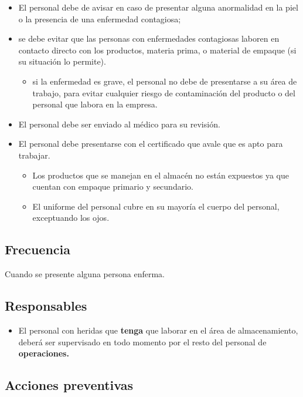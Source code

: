 \begin{itemize}
	\item El personal debe de avisar en caso de presentar alguna anormalidad en la piel o la presencia de una enfermedad contagiosa;
	\item se debe evitar que las personas con enfermedades contagiosas laboren en contacto directo con los productos, materia prima, o material de empaque (si su situación lo permite).
	\begin{itemize}
		\item si la enfermedad es grave, el personal no debe de presentarse a su área de trabajo, para evitar cualquier riesgo de contaminación del producto o del personal que labora en la empresa.
	\end{itemize}
	\item El personal debe ser enviado al médico para su revisión.
	\item El personal debe presentarse con el certificado que avale que es apto para trabajar.
	\begin{itemize}
		\item Los productos que se manejan en el almacén no están expuestos ya que cuentan con empaque primario y secundario.
		\item El uniforme del personal cubre en su mayoría el cuerpo del personal, exceptuando los ojos.
	\end{itemize}
\end{itemize}

\subsection{Frecuencia}

Cuando se presente alguna persona enferma.

\subsection{Responsables}

\begin{itemize}
	\item El personal con heridas que \textbf{tenga} que laborar en el área de almacenamiento, deberá ser supervisado en todo momento por el resto del personal de \textbf{operaciones.}
\end{itemize}

\subsection{Acciones preventivas}

